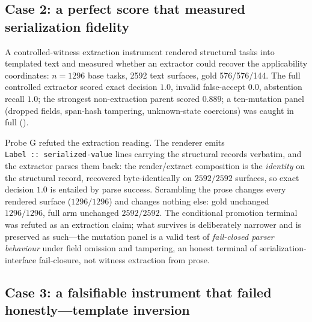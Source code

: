 \subsection{Case 2: a perfect score that measured serialization fidelity}
\label{sec:controlled-witness}

A controlled-witness extraction instrument rendered structural tasks into templated text and measured whether an extractor could recover the applicability coordinates: $n=1296$ base tasks, 2592 text surfaces, gold 576/576/144. The full controlled extractor scored exact decision $1.0$, invalid false-accept $0.0$, abstention recall $1.0$; the strongest non-extraction parent scored $0.889$; a ten-mutation panel (dropped fields, span-hash tampering, unknown-state coercions) was caught in full ().

Probe G refuted the extraction reading. The renderer emits \texttt{Label~::~serialized-value} lines carrying the structural records verbatim, and the extractor parses them back: the render/extract composition is the \emph{identity} on the structural record, recovered byte-identically on $2592/2592$ surfaces, so exact decision $1.0$ is entailed by parse success. Scrambling the prose changes every rendered surface ($1296/1296$) and changes nothing else: gold unchanged $1296/1296$, full arm unchanged $2592/2592$. The conditional promotion terminal was refuted as an extraction claim; what survives is deliberately narrower and is preserved as such---the mutation panel is a valid test of \emph{fail-closed parser behaviour} under field omission and tampering, an honest terminal of serialization-interface fail-closure, not witness extraction from prose.

\subsection{Case 3: a falsifiable instrument that failed honestly---template inversion}
\label{sec:prose-instrument}

